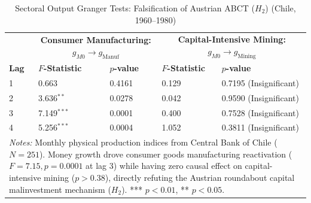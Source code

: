 \begin{table}[H]
\centering
\small
\caption{Sectoral Output Granger Tests: Falsification of Austrian ABCT ($H_2$) (Chile, 1960--1980)}
\label{tab:monthly_h2_falsification}
\begin{tabular}{p{1.2cm}p{3.4cm}p{2.4cm}p{3.4cm}p{2.4cm}}
\toprule
& \multicolumn{2}{c}{\textbf{Consumer Manufacturing: $g_{M0} \to g_{\text{Manuf}}$}} & \multicolumn{2}{c}{\textbf{Capital-Intensive Mining: $g_{M0} \to g_{\text{Mining}}$}} \\
\textbf{Lag} & \textbf{$F$-Statistic} & \textbf{$p$-value} & \textbf{$F$-Statistic} & \textbf{$p$-value} \\
\midrule
1 & 0.663 & 0.4161 & 0.129 & 0.7195 (Insignificant) \\
2 & 3.636$^{**}$ & 0.0278 & 0.042 & 0.9590 (Insignificant) \\
3 & 7.149$^{***}$ & 0.0001 & 0.400 & 0.7528 (Insignificant) \\
4 & 5.256$^{***}$ & 0.0004 & 1.052 & 0.3811 (Insignificant) \\
\bottomrule
\multicolumn{5}{p{13.8cm}}{\footnotesize \textit{Notes:} Monthly physical production indices from Central Bank of Chile ($N=251$). Money growth drove consumer goods manufacturing reactivation ($F=7.15, p = 0.0001$ at lag 3) while having zero causal effect on capital-intensive mining ($p > 0.38$), directly refuting the Austrian roundabout capital malinvestment mechanism ($H_2$). *** $p < 0.01$, ** $p < 0.05$.}
\end{tabular}
\end{table}
